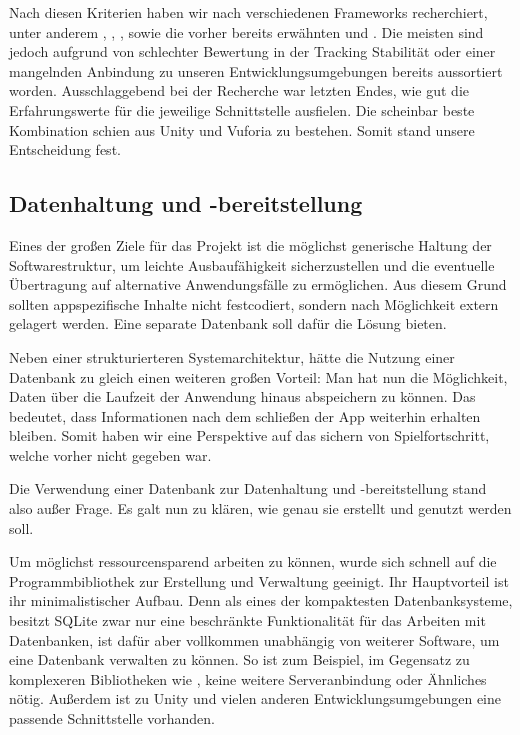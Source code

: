 Nach diesen Kriterien haben wir nach verschiedenen Frameworks recherchiert, unter anderem , , ,  sowie die vorher bereits erwähnten  und . Die meisten sind jedoch aufgrund von schlechter Bewertung in der Tracking Stabilität oder einer mangelnden Anbindung zu unseren Entwicklungsumgebungen bereits aussortiert worden. Ausschlaggebend bei der Recherche war letzten Endes, wie gut die Erfahrungswerte für die jeweilige Schnittstelle ausfielen. Die scheinbar beste Kombination schien aus Unity und Vuforia zu bestehen. Somit stand unsere Entscheidung fest.

\subsection{Datenhaltung und -bereitstellung}\label{datenhaltung und -bereitstellung}
Eines der großen Ziele für das Projekt ist die möglichst generische Haltung der Softwarestruktur, um leichte Ausbaufähigkeit sicherzustellen und die eventuelle Übertragung auf alternative Anwendungsfälle zu ermöglichen. Aus diesem Grund sollten appspezifische Inhalte nicht festcodiert, sondern nach Möglichkeit extern gelagert werden. Eine separate Datenbank soll dafür die Lösung bieten.

Neben einer strukturierteren Systemarchitektur, hätte die Nutzung einer Datenbank zu gleich einen weiteren großen Vorteil: Man hat nun die Möglichkeit, Daten über die Laufzeit der Anwendung hinaus abspeichern zu können. Das bedeutet, dass Informationen nach dem schließen der App weiterhin erhalten bleiben. Somit haben wir eine Perspektive auf das sichern von Spielfortschritt, welche vorher nicht gegeben war.

Die Verwendung einer Datenbank zur Datenhaltung und -bereitstellung stand also außer Frage. Es galt nun zu klären, wie genau sie erstellt und genutzt werden soll.

Um möglichst ressourcensparend arbeiten zu können, wurde sich schnell auf die Programmbibliothek  zur Erstellung und Verwaltung geeinigt. Ihr Hauptvorteil ist ihr minimalistischer Aufbau. Denn als eines der kompaktesten Datenbanksysteme, besitzt SQLite zwar nur eine beschränkte Funktionalität für das Arbeiten mit Datenbanken, ist dafür aber vollkommen unabhängig von weiterer Software, um eine Datenbank verwalten zu können. So ist zum Beispiel, im Gegensatz zu komplexeren Bibliotheken wie , keine weitere Serveranbindung oder Ähnliches nötig. Außerdem ist zu Unity und vielen anderen Entwicklungsumgebungen eine passende Schnittstelle vorhanden.

